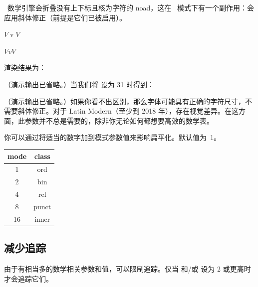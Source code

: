 
\TEX\ 数学引擎会折叠没有上下标且核为字符的  noad，这在 \OPENTYPE\ 模式下有一个副作用：会应用斜体修正（前提是它们已被启用）。

\begin{typing}

$V \mathbin{\mathbin{v}} V$\par
$V \mathord{\mathord{v}} V$\par
\end{typing}



渲染结果为：

（演示输出已省略。）当我们将  设为 31 时得到：

（演示输出已省略。）如果你看不出区别，那么字体可能具有正确的字符尺寸，不需要斜体修正。对于 Latin Modern（至少到 2018 年），存在视觉差异。在这方面，此参数并不总是需要的，除非你无论如何都想要高效的数学表。

你可以通过将适当的数字加到模式参数值来影响扁平化。默认值为~1。

\begin{longtable}{c c}
\toprule mode & class \\
\midrule
1   & ord   \\
2   & bin   \\
4   & rel   \\
8   & punct \\
16   & inner \\
\bottomrule
\end{longtable}

\subsection {减少追踪}


由于有相当多的数学相关参数和值，可以限制追踪。仅当  和/或  设为 2 或更高时才会追踪它们。


